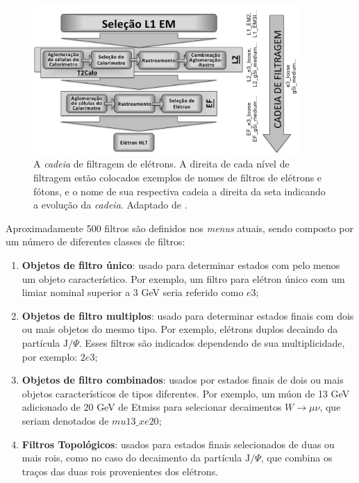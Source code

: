 \begin{figure}[ht!]
\label{fig:electron_chain}
\centering
\includegraphics[width=0.9\textwidth]{imagens/cadeia_eletron.png}
\caption[A \emph{cadeia} de filtragem de elétrons.]{A \emph{cadeia} de filtragem
de elétrons. A direita de cada nível de filtragem estão colocados exemplos de
nomes de filtros de elétrons e fótons, e o nome de sua respectiva cadeia a
direita da seta indicando a evolução da \emph{cadeia}. Adaptado de \cite{trigger_perf_2010}.}
\end{figure}

Aproximadamente 500 filtros são definidos nos \emph{menus} atuais, sendo
composto por um número de diferentes classes de filtros:

\begin{enumerate}
\item \textbf{Objetos de filtro único}: usado para determinar estados com pelo
menos um objeto característico. Por exemplo, um filtro para elétron único com um
limiar nominal superior a 3 GeV seria referido como $e3$;
\item \textbf{Objetos de filtro multiplos}: usado para determinar estados finais
com dois ou mais objetos do mesmo tipo. Por exemplo, elétrons duplos decaindo da
partícula $\text{J}/\Psi$. Esses filtros são indicados dependendo de sua
multiplicidade, por exemplo: $2e3$;
\item \textbf{Objetos de filtro combinados}: usados por estados finais de dois
ou mais objetos característicos de tipos diferentes. Por exemplo, um múon de 13
GeV adicionado de 20 GeV de \gls{Etmiss} para selecionar decaimentos
$W\rightarrow \mu\nu$, que seriam denotados de $mu13\_xe20$;
\item \textbf{Filtros Topológicos}: usados para estados finais selecionados de
duas ou mais \glspl{roi}, como no caso do decaimento da partícula
$\text{J}/\Psi$, que combina os traços das duas \glspl{roi} provenientes dos
elétrons.
\end{enumerate}

